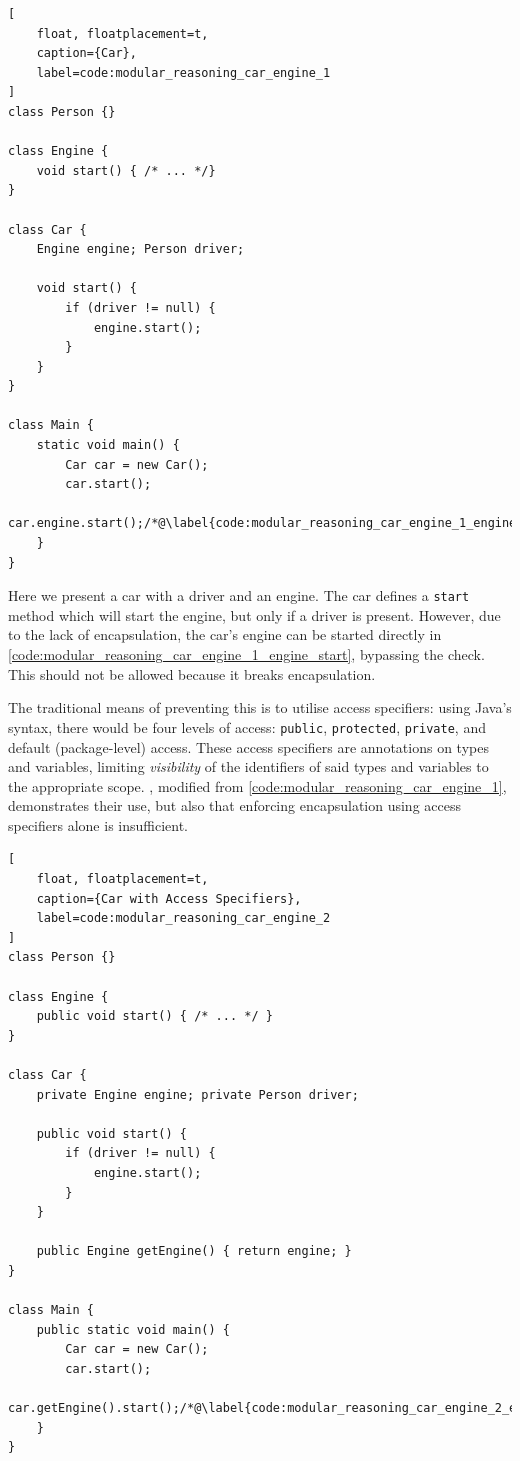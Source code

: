 \documentclass{acm_proc_article-sp}
\begin{document}
\begin{lstlisting}[
	float, floatplacement=t,
	caption={Car},
	label=code:modular_reasoning_car_engine_1
]
class Person {}

class Engine {
	void start() { /* ... */}
}

class Car {
	Engine engine; Person driver;

	void start() {
		if (driver != null) {
			engine.start();
		}
	}
}

class Main {
	static void main() {
		Car car = new Car();
		car.start();
		car.engine.start();/*@\label{code:modular_reasoning_car_engine_1_engine_start}@*/
	}
}
\end{lstlisting}

Here we present a car with a driver and an engine. The car defines a
\lstinline|start| method which will start the engine, but only if a driver is
present. However, due to the lack of encapsulation, the car's engine can be
started directly in \cref{code:modular_reasoning_car_engine_1_engine_start},
bypassing the check.  This should not be allowed because it breaks
encapsulation.

The traditional means of preventing this is to utilise access specifiers: using
Java's syntax, there would be four levels of access: \lstinline|public|,
\lstinline|protected|, \lstinline|private|, and default (package-level) access.
These access specifiers are annotations on types and variables, limiting
\emph{visibility} of the identifiers of said types and variables to the
appropriate scope. , modified from
\cref{code:modular_reasoning_car_engine_1}, demonstrates their use, but also
that enforcing encapsulation using access specifiers alone is insufficient.

\begin{lstlisting}[
	float, floatplacement=t,
	caption={Car with Access Specifiers},
	label=code:modular_reasoning_car_engine_2
]
class Person {}

class Engine {
	public void start() { /* ... */ }
}

class Car {
	private Engine engine; private Person driver;

	public void start() {
		if (driver != null) {
			engine.start();
		}
	}

	public Engine getEngine() { return engine; }
}

class Main {
	public static void main() {
		Car car = new Car();
		car.start();
		car.getEngine().start();/*@\label{code:modular_reasoning_car_engine_2_engine_start}@*/
	}
}

\end{lstlisting}
\end{document}
